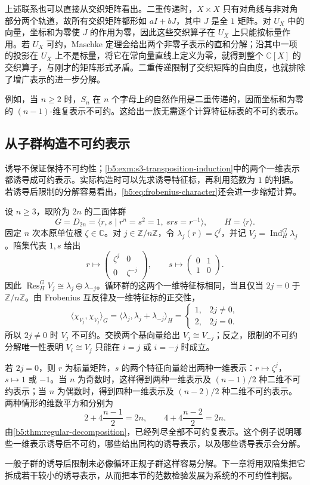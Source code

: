上述联系也可以直接从交织矩阵看出。二重传递时，\(X\times X\) 只有对角线与非对角部分两个轨道，故所有交织矩阵都形如 \(aI+bJ\)，其中 \(J\) 是全 \(1\) 矩阵。对 \(U_X\) 中的向量，坐标和为零使 \(J\) 的作用为零，因此这些交织算子在 \(U_X\) 上只能按标量作用。若 \(U_X\) 可约，Maschke 定理会给出两个非零子表示的直和分解；沿其中一项的投影在 \(U_X\) 上不是标量，将它在常向量直线上定义为零，就得到整个 \(\mathbb C[X]\) 的交织算子，与刚才的矩阵形式矛盾。二重传递限制了交织矩阵的自由度，也就排除了增广表示的进一步分解。

\ProseParagraphBreak
例如，当 \(n\ge2\) 时，\(S_n\) 在 \(n\) 个字母上的自然作用是二重传递的，因而坐标和为零的 \((n-1)\)-维复表示不可约。这给出一族无需逐个计算特征标表的不可约表示。

\subsection{从子群构造不可约表示}
\label{b5:subsec:0303:03}

诱导不保证保持不可约性；\cref{b5:exm:s3-transposition-induction}中的两个一维表示都诱导成可约表示。实际构造时可以先求诱导特征标，再利用范数为 \(1\) 的判据。若诱导后限制的分解容易看出，\eqref{b5:eq:frobenius-character}还会进一步缩短计算。

\begin{example}\label{b5:exm:dihedral-induced-family}
	设 \(n\ge3\)，取阶为 \(2n\) 的二面体群
	\[
		G=D_{2n}=\langle r,s\mid r^n=s^2=1,\ srs=r^{-1}\rangle, \qquad H=\langle r\rangle.
	\]
	固定 \(n\) 次本原单位根 \(\zeta\in\mathbb C\)。对 \(j\in\mathbb Z/n\mathbb Z\)，令 \(\lambda_j(r)=\zeta^j\)，并记 \(V_j=\operatorname{Ind}_H^G\lambda_j\)。陪集代表 \(1,s\) 给出
	\[
		r\longmapsto\begin{pmatrix}\zeta^j&0\\0&\zeta^{-j}\end{pmatrix},
		\qquad
		s\longmapsto\begin{pmatrix}0&1\\1&0\end{pmatrix}.
	\]
	因此 \(\operatorname{Res}_H^G V_j\cong\lambda_j\oplus\lambda_{-j}\)。循环群的这两个一维特征标相同，当且仅当 \(2j=0\) 于 \(\mathbb Z/n\mathbb Z\)。由 Frobenius 互反律及一维特征标的正交性，
	\[
		\langle\chi_{V_j},\chi_{V_j}\rangle_G =\langle\lambda_j,\lambda_j+\lambda_{-j}\rangle_H
		=\begin{cases}1,&2j\ne0,\\2,&2j=0.\end{cases}
	\]
	所以 \(2j\ne0\) 时 \(V_j\) 不可约。交换两个基向量给出 \(V_j\cong V_{-j}\)；反之，限制的不可约分解唯一性表明 \(V_i\cong V_j\) 只能在 \(i=j\) 或 \(i=-j\) 时成立。

	\ProseParagraphBreak
	若 \(2j=0\)，则 \(r\) 为标量矩阵，\(s\) 的两个特征向量给出两种一维表示：\(r\mapsto\zeta^j\)，\(s\mapsto1\) 或 \(-1\)。当 \(n\) 为奇数时，这样得到两种一维表示及 \((n-1)/2\) 种二维不可约表示；当 \(n\) 为偶数时，得到四种一维表示及 \((n-2)/2\) 种二维不可约表示。两种情形的维数平方和分别为
	\[
		2+4\frac{n-1}{2}=2n, \qquad 4+4\frac{n-2}{2}=2n.
	\]
	由\cref{b5:thm:regular-decomposition}，已经列尽全部不可约复表示。这个例子说明哪些一维表示诱导后不可约，哪些给出同构的诱导表示，以及哪些诱导表示会分解。
\end{example}

一般子群的诱导后限制未必像循环正规子群这样容易分解。下一章将用双陪集把它拆成若干较小的诱导表示，从而把本节的范数检验发展为系统的不可约性判据。
